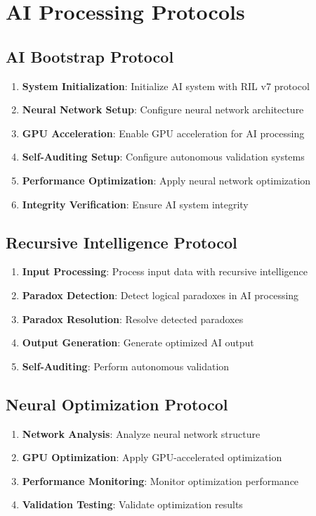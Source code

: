 \documentclass[12pt,a4paper]{article}
\begin{document}
\section{AI Processing Protocols}

\subsection{AI Bootstrap Protocol}
\begin{enumerate}
    \item \textbf{System Initialization}: Initialize AI system with RIL v7 protocol
    \item \textbf{Neural Network Setup}: Configure neural network architecture
    \item \textbf{GPU Acceleration}: Enable GPU acceleration for AI processing
    \item \textbf{Self-Auditing Setup}: Configure autonomous validation systems
    \item \textbf{Performance Optimization}: Apply neural network optimization
    \item \textbf{Integrity Verification}: Ensure AI system integrity
\end{enumerate}

\subsection{Recursive Intelligence Protocol}
\begin{enumerate}
    \item \textbf{Input Processing}: Process input data with recursive intelligence
    \item \textbf{Paradox Detection}: Detect logical paradoxes in AI processing
    \item \textbf{Paradox Resolution}: Resolve detected paradoxes
    \item \textbf{Output Generation}: Generate optimized AI output
    \item \textbf{Self-Auditing}: Perform autonomous validation
\end{enumerate}

\subsection{Neural Optimization Protocol}
\begin{enumerate}
    \item \textbf{Network Analysis}: Analyze neural network structure
    \item \textbf{GPU Optimization}: Apply GPU-accelerated optimization
    \item \textbf{Performance Monitoring}: Monitor optimization performance
    \item \textbf{Validation Testing}: Validate optimization results
\end{enumerate}
\end{document}
